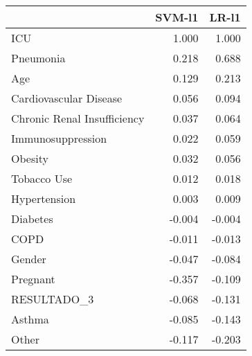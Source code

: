 \begin{tabular}{lrr}
\toprule
{} &  SVM-l1 &  LR-l1 \\
\midrule
ICU                         &   1.000 &  1.000 \\
Pneumonia                   &   0.218 &  0.688 \\
Age                         &   0.129 &  0.213 \\
Cardiovascular Disease      &   0.056 &  0.094 \\
Chronic Renal Insufficiency &   0.037 &  0.064 \\
Immunosuppression           &   0.022 &  0.059 \\
Obesity                     &   0.032 &  0.056 \\
Tobacco Use                 &   0.012 &  0.018 \\
Hypertension                &   0.003 &  0.009 \\
Diabetes                    &  -0.004 & -0.004 \\
COPD                        &  -0.011 & -0.013 \\
Gender                      &  -0.047 & -0.084 \\
Pregnant                    &  -0.357 & -0.109 \\
RESULTADO\_3                 &  -0.068 & -0.131 \\
Asthma                      &  -0.085 & -0.143 \\
Other                       &  -0.117 & -0.203 \\
\bottomrule
\end{tabular}
